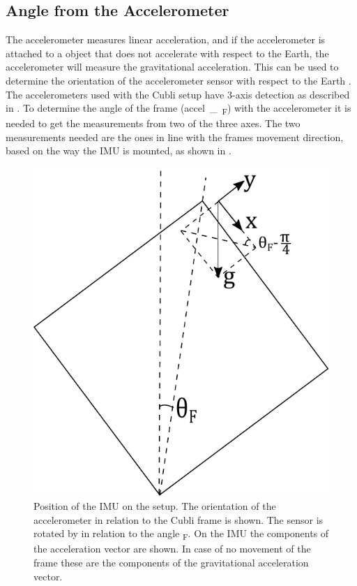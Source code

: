 \subsection{Angle from the Accelerometer}
The accelerometer measures linear acceleration, and if the accelerometer is attached to a object that does not accelerate with respect to the Earth, the accelerometer will measure the gravitational acceleration. This can be used to determine the orientation of the accelerometer sensor with respect to the Earth \cite{JWarren}.\\
The accelerometers used with the Cubli setup have 3-axis detection as described in . To determine the angle of the frame (\si{accel\_\theta_{F}}) with the accelerometer it is needed to get the measurements from two of the three axes. The two measurements needed are the ones in line with the frames movement direction, based on the way the IMU is mounted, as shown in . 
\begin{figure}[H]
	\centering
	\includegraphics[scale=0.58]{figures/accelerometer}
	\caption{Position of the IMU on the setup. The orientation of the accelerometer in relation to the Cubli frame is shown. The sensor is rotated by \si{} in relation to the angle \si{\theta_F}. On the IMU the components of the acceleration vector are shown. In case of no movement of the frame these are the components of the gravitational acceleration vector.}
	\label{accelerometer}
\end{figure}\vspace{-5mm}
